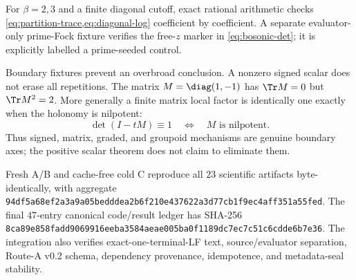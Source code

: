 For $\beta=2,3$ and a finite diagonal cutoff, exact rational arithmetic checks
\cref{eq:partition-trace,eq:diagonal-log} coefficient by coefficient.  A
separate evaluator-only prime-Fock fixture verifies the free-$z$ marker in
\cref{eq:bosonic-det}; it is explicitly labelled a prime-seeded control.

Boundary fixtures prevent an overbroad conclusion.  A nonzero signed scalar
does not erase all repetitions.  The matrix
$M=\diag(1,-1)$ has $\Tr M=0$ but $\Tr M^2=2$.  More generally a finite matrix
local factor is identically one exactly when the holonomy is nilpotent:
\begin{equation}
\det(I-tM)\equiv1
\quad\Longleftrightarrow\quad M\text{ is nilpotent}.
\label{eq:nilpotent-boundary}
\end{equation}
Thus signed, matrix, graded, and groupoid mechanisms are genuine boundary
axes; the positive scalar theorem does not claim to eliminate them.

Fresh A/B and cache-free cold C reproduce all $23$ scientific artifacts
byte-identically, with aggregate
\nolinkurl{94df5a68ef2a3a9a05bedddea2b6f210e437622a3d77cb1f9ec4aff351a55fed}.
The final $47$-entry canonical code/result ledger has SHA-256
\nolinkurl{8ca89e858fadd9069916eeba3584aeae005ba0f1189dc7ec7c51c6cdde6b7e36}.
The integration also verifies exact-one-terminal-LF text, source/evaluator
separation, Route-A v0.2 schema, dependency provenance, idempotence, and
metadata-seal stability.
